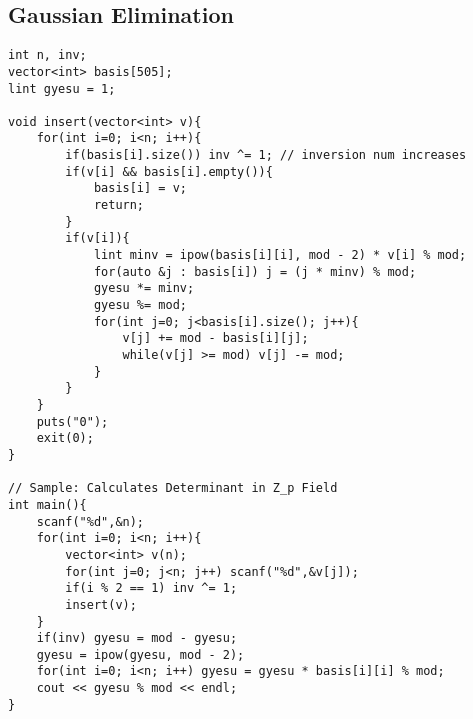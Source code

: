 \documentclass[landscape, 8pt, a4paper, oneside, twocolumn]{extarticle}
\begin{document}
\subsection{Gaussian Elimination}
\begin{verbatim}
int n, inv;
vector<int> basis[505];
lint gyesu = 1;

void insert(vector<int> v){
	for(int i=0; i<n; i++){
		if(basis[i].size()) inv ^= 1; // inversion num increases
		if(v[i] && basis[i].empty()){
			basis[i] = v;
			return;
		}
		if(v[i]){
			lint minv = ipow(basis[i][i], mod - 2) * v[i] % mod;
			for(auto &j : basis[i]) j = (j * minv) % mod;
			gyesu *= minv;
			gyesu %= mod;
			for(int j=0; j<basis[i].size(); j++){
				v[j] += mod - basis[i][j];
				while(v[j] >= mod) v[j] -= mod;
			}
		}
	}
	puts("0");
	exit(0);
}

// Sample: Calculates Determinant in Z_p Field
int main(){
	scanf("%d",&n);
	for(int i=0; i<n; i++){
		vector<int> v(n);
		for(int j=0; j<n; j++) scanf("%d",&v[j]);
		if(i % 2 == 1) inv ^= 1;
		insert(v);
	}
	if(inv) gyesu = mod - gyesu;
	gyesu = ipow(gyesu, mod - 2);
	for(int i=0; i<n; i++) gyesu = gyesu * basis[i][i] % mod;
	cout << gyesu % mod << endl; 
}
\end{verbatim}
\end{document}
